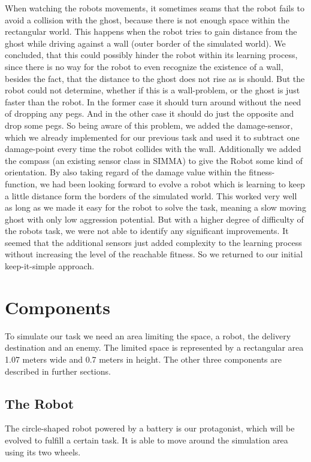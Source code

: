 \documentclass[12pt,fleqn,a4paper]{article}
\begin{document}
When watching the robots movements, it sometimes seams that the robot fails to avoid a collision with the ghost, because there is not enough space within the rectangular world. This happens when the robot tries to gain distance from the ghost while driving against a wall (outer border of the simulated world). We concluded, that this could possibly hinder the robot within its learning process, since there is no way for the robot to even recognize the existence of a wall, besides the fact, that the distance to the ghost does not rise as is should. But the robot could not determine, whether if this is a wall-problem, or the ghost is just faster than the robot. In the former case it should turn around without the need of dropping any pegs. And in the other case it should do just the opposite and drop some pegs. So being aware of this problem, we added the damage-sensor, which we already implemented for our previous task and used it to subtract one damage-point every time the robot collides with the wall. Additionally we added the compass (an existing sensor class in SIMMA) to give the Robot some kind of orientation. By also taking regard of the damage value within the fitness-function, we had been looking forward to evolve a robot which is learning to keep a little distance form the borders of the simulated world. This worked very well as long as we made it easy for the robot to solve the task, meaning a slow moving ghost with only low aggression potential. But with a higher degree of difficulty of the robots task, we were not able to identify any significant improvements. It seemed that the additional sensors just added complexity to the learning process without increasing the level of the reachable fitness. So we returned to our initial keep-it-simple approach.


\section{Components}
To simulate our task we need an area limiting the space, a robot, the delivery destination and an enemy. The limited space is represented by a rectangular area 1.07 meters wide and 0.7 meters in height. The other three components are described in further sections.

\subsection{The Robot}
The circle-shaped robot powered by a battery is our protagonist, which will be evolved to fulfill a certain task. It is able to move around the simulation area using its two wheels. 
\end{document}

